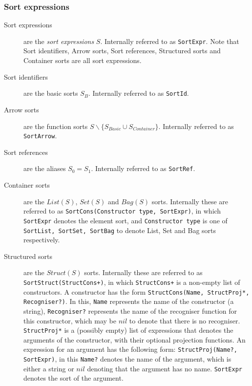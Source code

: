 \documentclass[a4paper,11pt]{article}
\newcommand{\List}{{\mathit{List}}}
\newcommand{\Set}{{\mathit{Set}}}
\newcommand{\Bag}{{\mathit{Bag}}}
\newcommand{\basicsort}{{S_{\mathit{Basic}}}}
\newcommand{\containersort}{{S_{\mathit{Container}}}}
\begin{document}
\subsubsection{Sort expressions}
\begin{description}
 \item [Sort expressions] are the \emph{sort expressions} $S$. Internally referred to as \texttt{SortExpr}. Note that Sort identifiers, Arrow sorts, Sort references, Structured sorts and Container sorts are all sort expressions.
 \item [Sort identifiers] are the basic sorts $S_B$. Internally referred to as \texttt{SortId}.
 \item [Arrow sorts] are the function sorts $S \backslash \{ \basicsort \cup \containersort \}$. Internally referred to as \texttt{SortArrow}.
 \item [Sort references] are the aliases $S_0 = S_1$. Internally referred to as \texttt{SortRef}.
 \item [Container sorts] are the $\List(S)$, $\Set(S)$ and $\Bag(S)$ sorts. Internally these are referred to as \texttt{SortCons(Constructor type, SortExpr)}, in which \texttt{SortExpr} denotes the element sort, and \texttt{Constructor type} is one of \texttt{SortList, SortSet, SortBag} to denote List, Set and Bag sorts respectively.
 \item [Structured sorts] are the $Struct(S)$ sorts. Internally these are referred to as \texttt{SortStruct(StructCons+)}, in which \texttt{StructCons+} is a non-empty list of constructors. A constructor has the form \texttt{StructCons(Name, StructProj*, Recogniser?)}. In this, \texttt{Name} represents the name of the constructor (a string), \texttt{Recogniser?} represents the name of the recogniser function for this constructor, which may be $nil$ to denote that there is no recogniser. \texttt{StructProj*} is a (possibly empty) list of expressions that denotes the arguments of the constructor, with their optional projection functions. An expression for an argument has the following form: \texttt{StructProj(Name?, SortExpr)}, in this \texttt{Name?} denotes the name of the argument, which is either a string or $nil$ denoting that the argument has no name. \texttt{SortExpr} denotes the sort of the argument.
\end{description}
\end{document}
